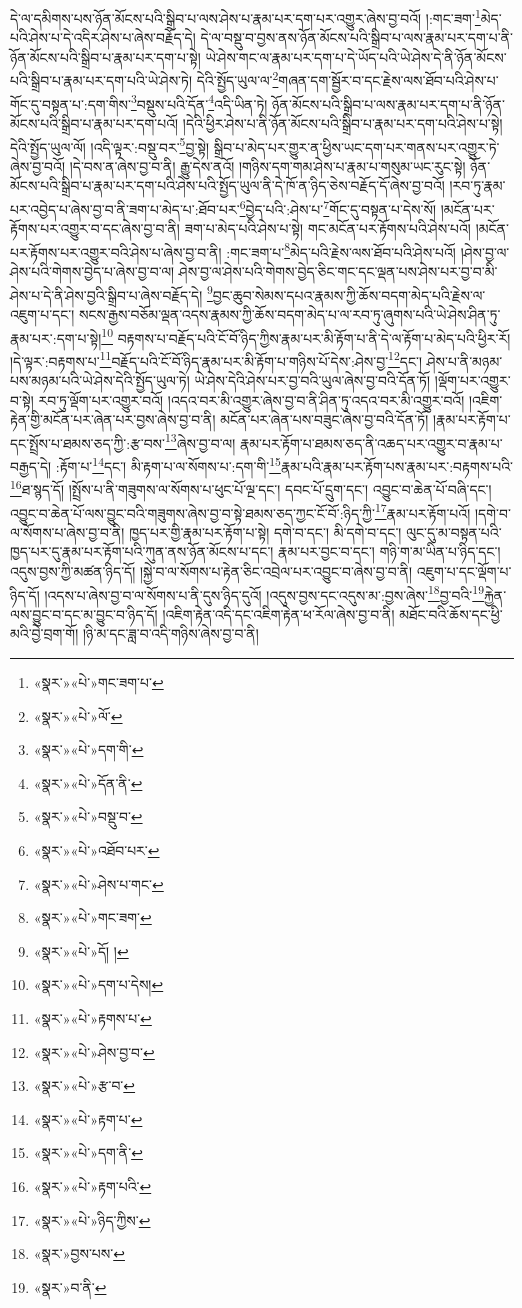 དེ་ལ་དམིགས་པས་ཉོན་མོངས་པའི་སྒྲིབ་པ་ལས་ཤེས་པ་རྣམ་པར་དག་པར་འགྱུར་ཞེས་བྱ་བའོ། །:གང་ཟག་\footnote{«སྣར་»«པེ་»གང་ཟག་པ་}མེད་པའི་ཤེས་པ་དེ་འདིར་ཤེས་པ་ཞེས་བརྗོད་དེ། དེ་ལ་བསྡུ་བ་བྱས་ནས་ཉོན་མོངས་པའི་སྒྲིབ་པ་ལས་རྣམ་པར་དག་པ་ནི་ཉོན་མོངས་པའི་སྒྲིབ་པ་རྣམ་པར་དག་པ་སྟེ། ཡེ་ཤེས་གང་ལ་རྣམ་པར་དག་པ་དེ་ཡོད་པའི་ཡེ་ཤེས་དེ་ནི་ཉོན་མོངས་པའི་སྒྲིབ་པ་རྣམ་པར་དག་པའི་ཡེ་ཤེས་ཏེ། དེའི་སྤྱོད་ཡུལ་ལ་\footnote{«སྣར་»«པེ་»ལོ་}གཞན་དག་སྦྱོར་བ་དང་རྗེས་ལས་ཐོབ་པའི་ཤེས་པ་གོང་དུ་བསྟན་པ་:དག་གིས་\footnote{«སྣར་»«པེ་»དག་གི་}བསྡུས་པའི་དོན་\footnote{«སྣར་»«པེ་»དོན་ནི་}འདི་ཡིན་ཏེ། ཉོན་མོངས་པའི་སྒྲིབ་པ་ལས་རྣམ་པར་དག་པ་ནི་ཉོན་མོངས་པའི་སྒྲིབ་པ་རྣམ་པར་དག་པའོ། །དེའི་ཕྱིར་ཤེས་པ་ནི་ཉོན་མོངས་པའི་སྒྲིབ་པ་རྣམ་པར་དག་པའི་ཤེས་པ་སྟེ། དེའི་སྤྱོད་ཡུལ་ལོ། །འདི་ལྟར་:བསྡུ་བར་\footnote{«སྣར་»«པེ་»བསྡུ་བ་}བྱ་སྟེ། སྒྲིབ་པ་མེད་པར་གྱུར་ན་ཕྱིས་ཡང་དག་པར་གནས་པར་འགྱུར་ཏེ་ཞེས་བྱ་བའོ། །དེ་བས་ན་ཞེས་བྱ་བ་ནི། རྒྱུ་དེས་ནའོ། །གཉིས་དག་གམ་ཤེས་པ་རྣམ་པ་གསུམ་ཡང་རུང་སྟེ། ཉོན་མོངས་པའི་སྒྲིབ་པ་རྣམ་པར་དག་པའི་ཤེས་པའི་སྤྱོད་ཡུལ་ནི་དེ་ཁོ་ན་ཉིད་ཅེས་བརྗོད་དོ་ཞེས་བྱ་བའོ། །རབ་ཏུ་རྣམ་པར་འབྱེད་པ་ཞེས་བྱ་བ་ནི་ཟག་པ་མེད་པ་:ཐོབ་པར་\footnote{«སྣར་»«པེ་»འཐོབ་པར་}བྱེད་པའི་:ཤེས་པ་\footnote{«སྣར་»«པེ་»ཤེས་པ་གང་}གོང་དུ་བསྟན་པ་དེས་སོ། །མངོན་པར་རྟོགས་པར་འགྱུར་བ་དང་ཞེས་བྱ་བ་ནི། ཟག་པ་མེད་པའི་ཤེས་པ་སྟེ། གང་མངོན་པར་རྟོགས་པའི་ཤེས་པའོ། །མངོན་པར་རྟོགས་པར་འགྱུར་བའི་ཤེས་པ་ཞེས་བྱ་བ་ནི། :གང་ཟག་པ་\footnote{«སྣར་»«པེ་»གང་ཟག་}མེད་པའི་རྗེས་ལས་ཐོབ་པའི་ཤེས་པའོ། །ཤེས་བྱ་ལ་ཤེས་པའི་གེགས་བྱེད་པ་ཞེས་བྱ་བ་ལ། ཤེས་བྱ་ལ་ཤེས་པའི་གེགས་བྱེད་ཅིང་གང་དང་ལྡན་པས་ཤེས་པར་བྱ་བ་མི་ཤེས་པ་དེ་ནི་ཤེས་བྱའི་སྒྲིབ་པ་ཞེས་བརྗོད་དེ། \footnote{«སྣར་»«པེ་»དོ། ། }བྱང་ཆུབ་སེམས་དཔའ་རྣམས་ཀྱི་ཆོས་བདག་མེད་པའི་རྗེས་ལ་འཇུག་པ་དང་། སངས་རྒྱས་བཅོམ་ལྡན་འདས་རྣམས་ཀྱི་ཆོས་བདག་མེད་པ་ལ་རབ་ཏུ་ཞུགས་པའི་ཡེ་ཤེས་ཤིན་ཏུ་རྣམ་པར་:དག་པ་སྟེ།\footnote{«སྣར་»«པེ་»དག་པ་དེས།} བརྟགས་པ་བརྗོད་པའི་ངོ་བོ་ཉིད་ཀྱིས་རྣམ་པར་མི་རྟོག་པ་ནི་དེ་ལ་རྟོག་པ་མེད་པའི་ཕྱིར་རོ། །དེ་ལྟར་:བརྟགས་པ་\footnote{«སྣར་»«པེ་»རྟགས་པ་}བརྗོད་པའི་ངོ་བོ་ཉིད་རྣམ་པར་མི་རྟོག་པ་གཉིས་པོ་དེས་:ཤེས་བྱ་\footnote{«སྣར་»«པེ་»ཤེས་བྱ་བ་}དང་། ཤེས་པ་ནི་མཉམ་པས་མཉམ་པའི་ཡེ་ཤེས་དེའི་སྤྱོད་ཡུལ་ཏེ། ཡེ་ཤེས་དེའི་ཤེས་པར་བྱ་བའི་ཡུལ་ཞེས་བྱ་བའི་དོན་ཏོ། །ལྡོག་པར་འགྱུར་བ་སྟེ། རབ་ཏུ་ལྡོག་པར་འགྱུར་བའོ། །འདའ་བར་མི་འགྱུར་ཞེས་བྱ་བ་ནི་ཤིན་ཏུ་འདའ་བར་མི་འགྱུར་བའོ། །འཇིག་རྟེན་གྱི་མངོན་པར་ཞེན་པར་བྱས་ཞེས་བྱ་བ་ནི། མངོན་པར་ཞེན་པས་བཟུང་ཞེས་བྱ་བའི་དོན་ཏོ། །རྣམ་པར་རྟོག་པ་དང་སྤྲོས་པ་ཐམས་ཅད་ཀྱི་:རྩ་བས་\footnote{«སྣར་»«པེ་»རྩ་བ་}ཞེས་བྱ་བ་ལ། རྣམ་པར་རྟོག་པ་ཐམས་ཅད་ནི་འཆད་པར་འགྱུར་བ་རྣམ་པ་བརྒྱད་དེ། :རྟོག་པ་\footnote{«སྣར་»«པེ་»རྟག་པ་}དང་། མི་རྟག་པ་ལ་སོགས་པ་:དག་གི་\footnote{«སྣར་»«པེ་»དག་ནི་}རྣམ་པའི་རྣམ་པར་རྟོག་པས་རྣམ་པར་:བརྟགས་པའི་\footnote{«སྣར་»«པེ་»རྟག་པའི་}ཐ་སྙད་དོ། །སྤྲོས་པ་ནི་གཟུགས་ལ་སོགས་པ་ཕུང་པོ་ལྔ་དང་། དབང་པོ་དྲུག་དང་། འབྱུང་བ་ཆེན་པོ་བཞི་དང་། འབྱུང་བ་ཆེན་པོ་ལས་བྱུང་བའི་གཟུགས་ཞེས་བྱ་བ་སྟེ་ཐམས་ཅད་ཀྱང་ངོ་བོ་:ཉིད་ཀྱི་\footnote{«སྣར་»«པེ་»ཉིད་ཀྱིས་}རྣམ་པར་རྟོག་པའོ། །དགེ་བ་ལ་སོགས་པ་ཞེས་བྱ་བ་ནི། ཁྱད་པར་གྱི་རྣམ་པར་རྟོག་པ་སྟེ། དགེ་བ་དང་། མི་དགེ་བ་དང་། ལུང་དུ་མ་བསྟན་པའི་ཁྱད་པར་དུ་རྣམ་པར་རྟོག་པའི་ཀུན་ནས་ཉོན་མོངས་པ་དང་། རྣམ་པར་བྱང་བ་དང་། གཉི་ག་མ་ཡིན་པ་ཉིད་དང་། འདུས་བྱས་ཀྱི་མཚན་ཉིད་དོ། །སྐྱེ་བ་ལ་སོགས་པ་རྟེན་ཅིང་འབྲེལ་པར་འབྱུང་བ་ཞེས་བྱ་བ་ནི། འཇུག་པ་དང་ལྡོག་པ་ཉིད་དོ། །འདས་པ་ཞེས་བྱ་བ་ལ་སོགས་པ་ནི་དུས་ཉིད་དུའོ། །འདུས་བྱས་དང་འདུས་མ་:བྱས་ཞེས་\footnote{«སྣར་»བྱས་པས་}བྱ་བའི་\footnote{«སྣར་»བ་ནི་}རྐྱེན་ལས་བྱུང་བ་དང་མ་བྱུང་བ་ཉིད་དོ། །འཇིག་རྟེན་འདི་དང་འཇིག་རྟེན་ཕ་རོལ་ཞེས་བྱ་བ་ནི། མཐོང་བའི་ཆོས་དང་ཕྱི་མའི་བྱེ་བྲག་གོ། །ཉི་མ་དང་ཟླ་བ་འདི་གཉིས་ཞེས་བྱ་བ་ནི། 